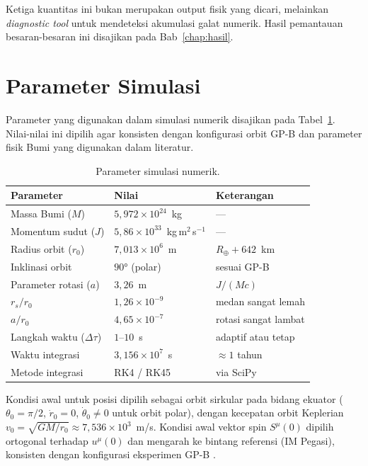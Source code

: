 Ketiga kuantitas ini bukan merupakan output fisik yang dicari,
melainkan \textit{diagnostic tool} untuk mendeteksi akumulasi galat numerik.
Hasil pemantauan besaran-besaran ini disajikan pada Bab~\ref{chap:hasil}.


\section{Parameter Simulasi}
\label{sec:parameter-simulasi}

Parameter yang digunakan dalam simulasi numerik
disajikan pada Tabel~\ref{tab:param-simulasi}.
Nilai-nilai ini dipilih agar konsisten dengan konfigurasi orbit GP-B
dan parameter fisik Bumi yang digunakan dalam literatur.

\begin{table}[ht]
\centering
\caption{Parameter simulasi numerik.}
\label{tab:param-simulasi}
\begin{tabular}{lll}
\toprule
\textbf{Parameter} & \textbf{Nilai} & \textbf{Keterangan} \\
\midrule
Massa Bumi ($M$) & $5{,}972 \times 10^{24}$~kg & --- \\
Momentum sudut ($J$) & $5{,}86 \times 10^{33}$~kg\,m$^2$\,s$^{-1}$ & --- \\
Radius orbit ($r_0$) & $7{,}013 \times 10^6$~m & $R_\oplus + 642$~km \\
Inklinasi orbit & $90°$ (polar) & sesuai GP-B \\
Parameter rotasi ($a$) & $3{,}26$~m & $J/(Mc)$ \\
$r_s/r_0$ & $1{,}26 \times 10^{-9}$ & medan sangat lemah \\
$a/r_0$ & $4{,}65 \times 10^{-7}$ & rotasi sangat lambat \\
Langkah waktu ($\Delta\tau$) & $1$--$10$~s & adaptif atau tetap \\
Waktu integrasi & $3{,}156 \times 10^7$~s & $\approx 1$ tahun \\
Metode integrasi & RK4 / RK45 & via SciPy \\
\bottomrule
\end{tabular}
\end{table}

Kondisi awal untuk posisi dipilih sebagai orbit sirkular
pada bidang ekuator ($\theta_0 = \pi/2$, $\dot{r}_0 = 0$, $\dot{\theta}_0 \neq 0$
untuk orbit polar), dengan kecepatan orbit Keplerian
$v_0 = \sqrt{GM/r_0} \approx 7{,}536 \times 10^3$~m/s.
Kondisi awal vektor spin $S^\mu(0)$ dipilih ortogonal terhadap
$u^\mu(0)$ dan mengarah ke bintang referensi (IM Pegasi),
konsisten dengan konfigurasi eksperimen GP-B
\parencite{Everitt2011GravityProbeB}.

